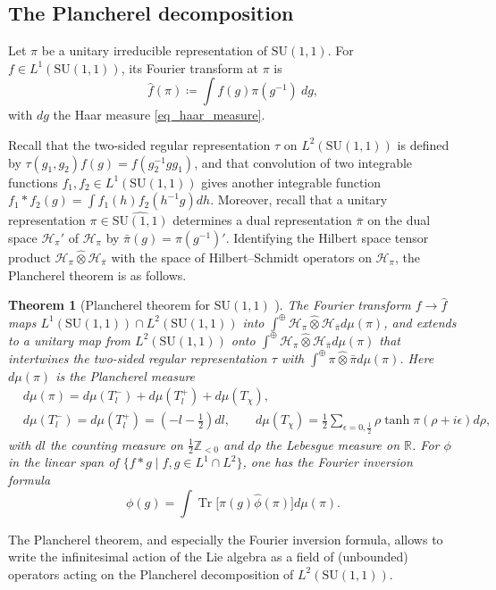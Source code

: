\documentclass{amsart}
\newtheorem{theorem}{Theorem}[section]
\theoremstyle{definition}
\theoremstyle{remark}
\DeclareMathOperator{\Tr}{Tr}
\numberwithin{equation}{section}
\begin{document}
\subsection{The Plancherel decomposition}
Let $\pi$ be a unitary irreducible representation of $\mathrm{SU}(1,1)$. For $f\in L^1(\mathrm{SU}(1,1))$, its Fourier transform at $\pi$ is
\begin{equation}
    \hat{f}(\pi)\coloneq\int f(g)\pi(g^{-1})\ dg,
\end{equation}
with $dg$ the Haar measure \eqref{eq_haar_measure}. 

Recall that the two-sided regular representation $\tau$ on $L^2(\mathrm{SU}(1,1))$ is defined by $\tau(g_1,g_2)f(g)=f(g_2^{-1}gg_1)$, and that convolution of two integrable functions $f_1,f_2\in L^1(\mathrm{SU}(1,1))$ gives another integrable function $f_1*f_2(g)=\int f_1(h)f_2(h^{-1}g)dh$. Moreover, recall that a unitary representation $\pi\in\widehat{\mathrm{SU}(1,1)}$ determines a dual representation $\bar{\pi}$ on the dual space $\mathcal{H}_\pi'$ of $\mathcal{H}_\pi$ by $\bar{\pi}(g)=\pi(g^{-1})'$. Identifying the Hilbert space tensor product $\mathcal{H}_\pi\hat{\otimes}\mathcal{H}_{\bar{\pi}}$ with the space of Hilbert--Schmidt operators on $\mathcal{H}_\pi$, the Plancherel theorem is as follows.

\begin{theorem}[Plancherel theorem for $\mathrm{SU}(1,1)$ \cite{harish-chandra_1952}]\label{plancherel_theorem}
    The Fourier transform $f\rightarrow\hat{f}$ maps $L^1(\mathrm{SU}(1,1))\cap L^2(\mathrm{SU}(1,1))$ into $\int^\oplus\mathcal{H}_\pi\hat{\otimes}\mathcal{H}_{\bar{\pi}}d\mu(\pi)$, and extends to a unitary map from $L^2(\mathrm{SU}(1,1))$ onto $\int^\oplus\mathcal{H}_\pi\hat{\otimes}\mathcal{H}_{\bar{\pi}}d\mu(\pi)$ that intertwines the two-sided regular representation $\tau$ with $\int^\oplus \pi\hat{\otimes}\bar{\pi}d\mu(\pi)$. Here $d\mu(\pi)$ is the Plancherel measure
    \begin{align*}
        &d\mu(\pi)=d\mu(T_l^-)+d\mu(T_l^+)+d\mu(T_\chi),\\
        &d\mu(T_l^-)=d\mu(T_l^+)=(-l-\tfrac{1}{2})dl,\qquad d\mu(T_\chi)=\frac{1}{2}\sum_{\epsilon=0,\tfrac{1}{2}}\rho\tanh\pi(\rho+i\epsilon)d\rho,
    \end{align*}
    with $dl$ the counting measure on $\tfrac{1}{2}\mathbb{Z}_{<0}$ and $d\rho$ the Lebesgue measure on $\mathbb{R}$. For $\phi$ in the linear span of $\{f*g\mid f,g\in L^1\cap L^2\}$, one has the Fourier inversion formula
    \begin{equation*}
        \phi(g)=\int\Tr\big[\pi(g)\hat{\phi}(\pi)\big]d\mu(\pi).
    \end{equation*}
\end{theorem}
The Plancherel theorem, and especially the Fourier inversion formula, allows to write the infinitesimal action of the Lie algebra as a field of (unbounded) operators acting on the Plancherel decomposition of $L^2(\mathrm{SU}(1,1))$. 
\end{document}
